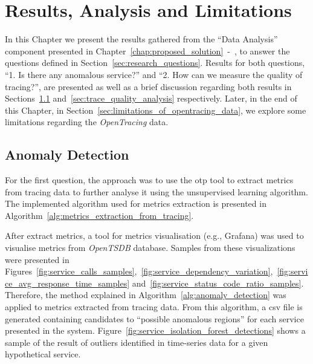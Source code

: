 \glsresetall
\chapter{Results, Analysis and Limitations}
\label{chap:results_analysis_and_limitations}

In this Chapter we present the results gathered from the ``Data Analysis'' component presented in Chapter~\ref{chap:proposed_solution}~-~, to answer the questions defined in Section~\ref{sec:research_questions}. Results for both questions, ``1. Is there any anomalous service?'' and ``2. How can we measure the quality of tracing?'', are presented as well as a brief discussion regarding both results in Sections~\ref{sec:anomaly_detection} and~\ref{sec:trace_quality_analysis} respectively. Later, in the end of this Chapter, in Section~\ref{sec:limitations_of_opentracing_data}, we explore some limitations regarding the \emph{OpenTracing} data. 

\section{Anomaly Detection}
\label{sec:anomaly_detection}

For the first question, the approach was to use the \gls{otp} tool to extract metrics from tracing data to further analyse it using the unsupervised learning algorithm. The implemented algorithm used for metrics extraction is presented in Algorithm~\ref{alg:metrics_extraction_from_tracing}.

After extract metrics, a tool for metrics visualisation (e.g., Grafana) was used to visualise metrics from \emph{OpenTSDB} database. Samples from these visualizations were presented in Figures~\ref{fig:service_calls_samples},~\ref{fig:service_dependency_variation},~\ref{fig:service_avg_response_time_samples} and~\ref{fig:service_status_code_ratio_samples}. Therefore, the method explained in Algorithm~\ref{alg:anomaly_detection} was applied to metrics extracted from tracing data. From this algorithm, a \gls{csv} file is generated containing candidates to ``possible anomalous regions'' for each service presented in the system. Figure~\ref{fig:service_isolation_forest_detections} shows a sample of the result of outliers identified in time-series data for a given hypothetical service.



